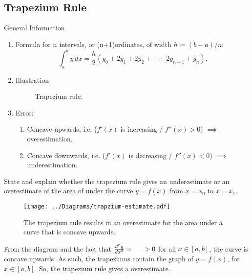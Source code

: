 \documentclass[oneside]{book}
\begin{document}
\subsection{Trapezium Rule}
\begin{stbox}{General Information}
    \begin{enumerate}
      \item Formula for \(n\) intervals, or (n+1)ordinates, of width \(h\coloneq (b-a)/n\): 
      \[\int_{a}^{b}y\,dx=\frac{h}{2}(y_0+2y_1+2y_2+\cdots+2y_{n-1}+y_n).\]
      \item Illustration
      \begin{figure}[H]
        \centering
        
        \caption{Trapezium rule.}
        \label{fig:trapzium-rule}
      \end{figure}
    \item Error: 
    \begin{enumerate}
      \item Concave upwards, i.e. (\(f'(x)\) is increasing / \(f''(x)>0\)) \(\implies\) overestimation.
      \item Concave downwards, i.e. (\(f'(x)\) is decreasing / \(f''(x)<0\)) \(\implies\) underestimation.
    \end{enumerate}
    \end{enumerate}
    \end{stbox}
    \begin{note}
      State and explain whether the trapezium rule gives an underestimate or an overestimate of the area of under the curve \(y=f(x)\) from \(x=x_0\) to \(x=x_1\).
      \begin{figure}[H]
        \centering
        \texttt{[image: ../Diagrams/trapzium-estimate.pdf]}
        \caption{The trapezium rule results in an overestimate for the area under a curve that is concave upwards.}
        \label{fig:trapezium-overestimate}
      \end{figure}
      From the diagram and the fact that \(\frac{d^2y}{dx^2}=\rule{0.5cm}{0.01mm}>0\) for all \(x\in[a,b]\), the curve is concave upwards. As such, the trapeziums contain the graph of \(y=f(x)\), for \(x\in[a,b]\). So, the trapezium rule gives a overestimate.
    \end{note}
\end{document}
